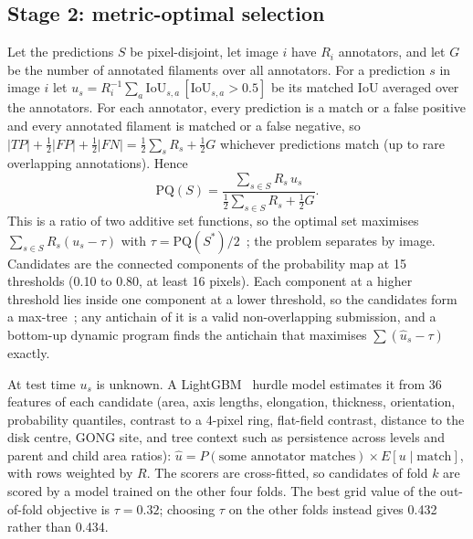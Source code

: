 \documentclass[sigconf]{acmart}
\begin{document}
\subsection{Stage 2: metric-optimal selection}
Let the predictions $S$ be pixel-disjoint, let image $i$ have $R_i$ annotators, and let $G$ be the number of annotated filaments over all annotators. For a prediction $s$ in image $i$ let $u_s = R_i^{-1}\sum_a \mathrm{IoU}_{s,a}\,[\mathrm{IoU}_{s,a}>0.5]$ be its matched IoU averaged over the annotators. For each annotator, every prediction is a match or a false positive and every annotated filament is matched or a false negative, so $|TP| + \tfrac12|FP| + \tfrac12|FN| = \tfrac12\sum_{s} R_s + \tfrac12 G$ whichever predictions match (up to rare overlapping annotations). Hence
\begin{equation}
\mathrm{PQ}(S) = \frac{\sum_{s\in S} R_s\, u_s}{\tfrac12\sum_{s\in S} R_s + \tfrac12 G}. \label{eq:pq}
\end{equation}
This is a ratio of two additive set functions, so the optimal set maximises $\sum_{s\in S} R_s (u_s-\tau)$ with $\tau=\mathrm{PQ}(S^*)/2$~\cite{dinkelbach1967}; the problem separates by image. Candidates are the connected components of the probability map at 15 thresholds (0.10 to 0.80, at least 16 pixels). Each component at a higher threshold lies inside one component at a lower threshold, so the candidates form a max-tree~\cite{salembier1998maxtree}; any antichain of it is a valid non-overlapping submission, and a bottom-up dynamic program finds the antichain that maximises $\sum (\hat u_s-\tau)$ exactly.

At test time $u_s$ is unknown. A LightGBM~\cite{ke2017lightgbm} hurdle model estimates it from 36 features of each candidate (area, axis lengths, elongation, thickness, orientation, probability quantiles, contrast to a 4-pixel ring, flat-field contrast, distance to the disk centre, GONG site, and tree context such as persistence across levels and parent and child area ratios): $\hat u = P(\text{some annotator matches})\times E[u\mid\text{match}]$, with rows weighted by $R$. The scorers are cross-fitted, so candidates of fold $k$ are scored by a model trained on the other four folds. The best grid value of the out-of-fold objective is $\tau=0.32$; choosing $\tau$ on the other folds instead gives 0.432 rather than 0.434.
\end{document}
